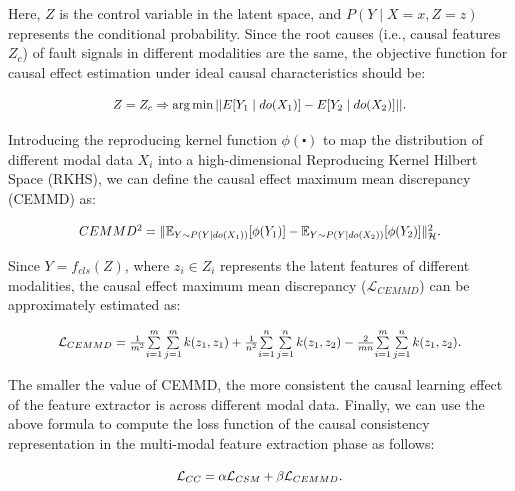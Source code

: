 \documentclass[preprint,12pt]{elsarticle}
\begin{document}
Here, $Z$ is the control variable in the latent space, and $P(Y\mid X=x,Z=z)$ represents the conditional probability. Since the root causes (i.e., causal features ${{Z}_{c}}$) of fault signals in different modalities are the same, the objective function for causal effect estimation under ideal causal characteristics should be:

\begin{equation}
  \scalebox{0.9}{$
  Z={{Z}_{c}}\Rightarrow \arg \min ||E[{{Y}_{1}}\mid do({{X}_{1}})]-E[{{Y}_{2}}\mid do({{X}_{2}})]||$}.
  \label{eq7}
\end{equation}

Introducing the reproducing kernel function $\phi (\centerdot )$ to map the distribution of different modal data ${{X}_{i}}$ into a high-dimensional Reproducing Kernel Hilbert Space (RKHS), we can define the causal effect maximum mean discrepancy (CEMMD) as:

\begin{equation}
  \scalebox{0.9}{$
  CEMM{{D}^{2}}=\|{{\mathbb{E}}_{Y\sim P(Y|do({{X}_{1}}))}}[\phi ({{Y}_{1}})]-{{\mathbb{E}}_{Y\sim P(Y|do({{X}_{2}}))}}[\phi ({{Y}_{2}})]\|_{\mathcal{H}}^{2}$}.
  \label{eq8}
\end{equation}

Since $Y={{f}_{cls}}(Z)$, where ${{z}_{i}}\in {{Z}_{i}}$ represents the latent features of different modalities, the causal effect maximum mean discrepancy (${{\mathcal{L}}_{CEMMD}}$) can be approximately estimated as:

\begin{equation}
  \scalebox{0.9}{$
  {{\mathcal{L}}_{CEMMD}}=\frac{1}{{{m}^{2}}}\underset{i=1}{\overset{m}{\mathop \sum }}\,\underset{j=1}{\overset{m}{\mathop \sum }}\,k({{z}_{1}},{{z}_{1}})+\frac{1}{{{n}^{2}}}\underset{i=1}{\overset{n}{\mathop \sum }}\,\underset{j=1}{\overset{n}{\mathop \sum }}\,k({{z}_{1}},{{z}_{2}})-\frac{2}{mn}\underset{i=1}{\overset{m}{\mathop \sum }}\,\underset{j=1}{\overset{n}{\mathop \sum }}\,k({{z}_{1}},{{z}_{2}})$}.
  \label{eq9}
\end{equation}

The smaller the value of CEMMD, the more consistent the causal learning effect of the feature extractor is across different modal data. Finally, we can use the above formula to compute the loss function of the causal consistency representation in the multi-modal feature extraction phase as follows:

\begin{equation}
  \scalebox{0.9}{$
  {{\mathcal{L}}_{CC}}=\alpha {{\mathcal{L}}_{CSM}}+\beta {{\mathcal{L}}_{CEMMD}}$}.
  \label{eq10}
\end{equation}
\end{document}
